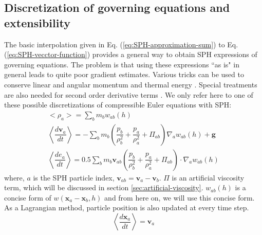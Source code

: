 \documentclass[journal abbreviation, manuscript]{copernicus}
\begin{document}
\subsection{Discretization of governing equations and extensibility}
The basic interpolation given in Eq. (\ref{eq:SPH-approximation-sum}) to Eq. (\ref{eq:SPH-vecctor-function}) provides a general way to obtain SPH expressions of governing equations. The problem is that using these expressions ``{as is}" in general leads to quite poor gradient estimates. Various tricks can be used to conserve linear and angular momentum and thermal energy \citep{monaghan1992smoothed}. Special treatments are also needed for second order derivative terms \citep{monaghan2005smoothed}. We only refer here to one of these possible discretizations of compressible Euler equations with SPH:
\begin{align}
<\rho_a> = \sum_b m_b w_{ab} \left(h\right) \label{eq:ns-sph-d} \\
\left\langle\dfrac{d \textbf{v}_a}{d t}\right\rangle = -\sum_b m_b \left(\dfrac{p_b}{\rho_b^2} + \dfrac{p_a}{\rho_a^2} + \Pi_{ab}\right) \nabla_a w_{a b}\left(h\right) +\textbf{g} \label{eq:ns-sph-v} \\
\left\langle\dfrac{d e_a}{d t}\right\rangle=
 0.5\sum_b m_b \textbf{v}_{a b}\left(\dfrac{p_b}{\rho_b^2} + \dfrac{p_a}{\rho_a^2} + \Pi_{ab}\right) \cdot \nabla_a w_{a b}\left(h\right) \label{eq:ns-sph-e}
\end{align}
where, $a$ is the SPH particle index, $\textbf{v}_{a b} = \textbf{v}_a - \textbf{v}_b$. $\Pi$ is an artificial viscosity term, which will be discussed in section \ref{sec:artificial-viscosity}. $w_{a b}\left(h\right)$ is a concise form of $w\left(\textbf{x}_a - \textbf{x}_b, h\right)$ and from here on, we will use this concise form.
As a Lagrangian method, particle position is also updated at every time step.
\begin{equation}
\left\langle\dfrac{d \textbf{x}_a}{dt}\right\rangle = \textbf{v}_a \label{eq:SPH-update-pos}
\end{equation}
\end{document}
